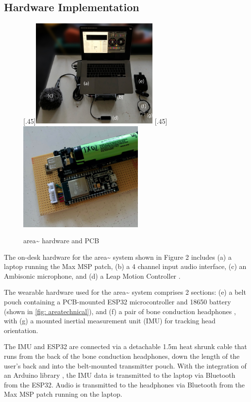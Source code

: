 \subsection{Hardware Implementation}            \label{sec: area-system-hardware}
\begin{figure}
    \centering
    \subcaptionbox*{}[.45\textwidth]{\includegraphics[height=5.5cm]{figures/c_5/areatechnical_hardware.png}}%
    \hfill
    \subcaptionbox*{}[.45\textwidth]{\includegraphics[height=5.5cm]{figures/c_5/areatechnical_pcb.png}}%
    \caption{area\textasciitilde{} hardware and PCB}
    \label{fig: areatechnical}
\end{figure}

The on-desk hardware for the area\textasciitilde{} system shown in Figure 2 includes (a) a laptop running the Max MSP \citep{cycling742020} patch, (b) a 4 channel input audio interface, (c) an Ambisonic microphone, and (d) a Leap Motion Controller \citep{ultraleap2020}.

The wearable hardware used for the area\textasciitilde{} system comprises 2 sections: (e) a belt pouch containing a PCB-mounted ESP32 microcontroller \citep{espressif2020} and 18650 battery (shown in \autoref{fig: areatechnical}), and (f) a pair of bone conduction headphones \citep{aftershokz2020}, with (g) a mounted inertial measurement unit (IMU) for tracking head orientation. 

The IMU and ESP32 are connected via a detachable 1.5m heat shrunk cable that runs from the back of the bone conduction headphones, down the length of the user's back and into the belt-mounted transmitter pouch. With the integration of an Arduino library \citep{winer2016}, the IMU data is transmitted to the laptop via Bluetooth from the ESP32. Audio is transmitted to the headphones via Bluetooth from the Max MSP patch running on the laptop. 

